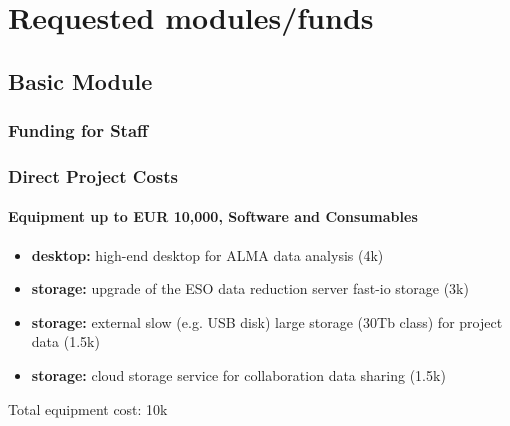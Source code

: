 \documentclass[10pt,fleqn,twoside]{article}
\begin{document}
\section{Requested modules/funds}
\renewcommand{\leftmark}{\sc  Requested modules/funds}

\subsection{Basic Module}

\subsubsection{Funding for Staff}

\todo{[Text]}


\subsubsection{Direct Project Costs}

\todo{[Text]}

\paragraph{Equipment up to EUR 10,000, Software and Consumables}

\begin{itemize}
\item {\bf desktop:} high-end desktop for ALMA data analysis (4k\EUR{}) 
\item {\bf storage:} upgrade of the ESO data reduction server fast-io storage (3k\EUR{})
\item {\bf storage:} external slow (e.g. USB disk) large storage (30Tb class) for project data (1.5k\EUR{})
\item {\bf storage:} cloud storage service for collaboration data sharing (1.5k\EUR{})
\end{itemize}

Total equipment cost: 10k\EUR{}  
\end{document}
